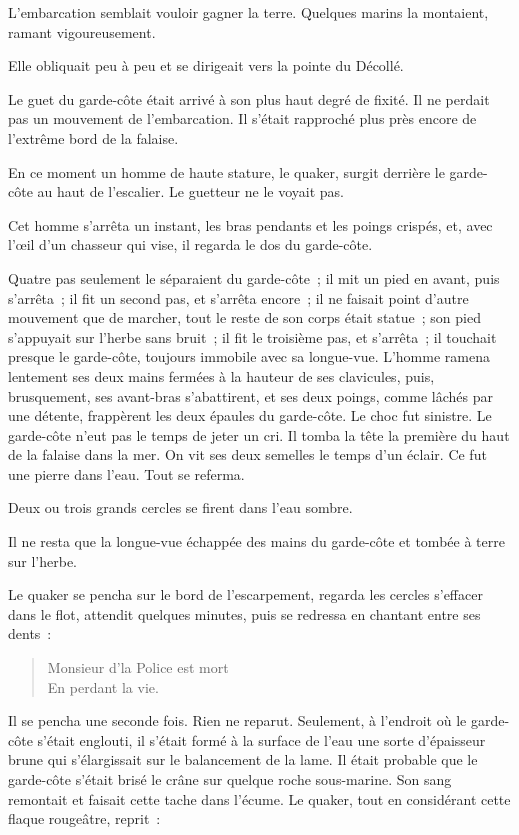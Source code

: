 \documentclass[french,twoside]{book} %
\begin{document}
L’embarcation semblait vouloir gagner la terre. Quelques marins la montaient, ramant vigoureusement.\par
Elle obliquait peu à peu et se dirigeait vers la pointe du Décollé.\par
Le guet du garde-côte était arrivé à son plus haut degré de fixité. Il ne perdait pas un mouvement de l’embarcation. Il s’était rapproché plus près encore de l’extrême bord de la falaise.\par
En ce moment un homme de haute stature, le quaker, surgit derrière le garde-côte au haut de l’escalier. Le guetteur ne le voyait pas.\par
Cet homme s’arrêta un instant, les bras pendants et les poings crispés, et, avec l’œil d’un chasseur qui vise, il regarda le dos du garde-côte.\par
Quatre pas seulement le séparaient du garde-côte ; il mit un pied en avant, puis s’arrêta ; il fit un second pas, et s’arrêta encore ; il ne faisait point d’autre mouvement que de marcher, tout le reste de son corps  était statue ; son pied s’appuyait sur l’herbe sans bruit ; il fit le troisième pas, et s’arrêta ; il touchait presque le garde-côte, toujours immobile avec sa longue-vue. L’homme ramena lentement ses deux mains fermées à la hauteur de ses clavicules, puis, brusquement, ses avant-bras s’abattirent, et ses deux poings, comme lâchés par une détente, frappèrent les deux épaules du garde-côte. Le choc fut sinistre. Le garde-côte n’eut pas le temps de jeter un cri. Il tomba la tête la première du haut de la falaise dans la mer. On vit ses deux semelles le temps d’un éclair. Ce fut une pierre dans l’eau. Tout se referma.\par
Deux ou trois grands cercles se firent dans l’eau sombre.\par
Il ne resta que la longue-vue échappée des mains du garde-côte et tombée à terre sur l’herbe.\par
Le quaker se pencha sur le bord de l’escarpement, regarda les cercles s’effacer dans le flot, attendit quelques minutes, puis se redressa en chantant entre ses dents :\par


\begin{verse}
Monsieur d’la Police est mort\\
En perdant la vie.\\
\end{verse}

\noindent Il se pencha une seconde fois. Rien ne reparut. Seulement, à l’endroit où le garde-côte s’était englouti, il s’était formé à la surface de l’eau une sorte d’épaisseur brune qui s’élargissait sur le balancement de la lame. Il était probable que le garde-côte s’était brisé le crâne sur quelque roche sous-marine. Son  sang remontait et faisait cette tache dans l’écume. Le quaker, tout en considérant cette flaque rougeâtre, reprit :\par
\end{document}
